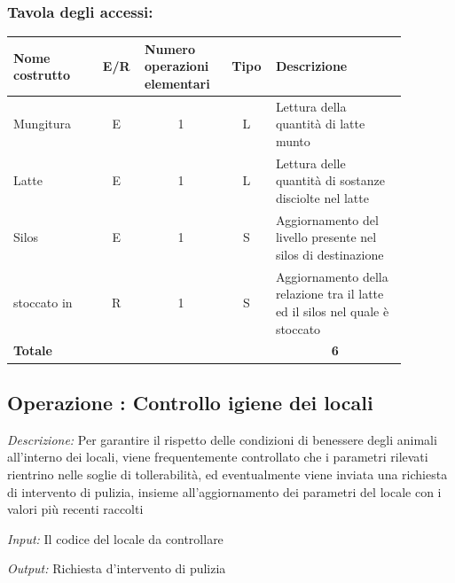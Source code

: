 \documentclass[12pt,a4paper]{article}
\begin{document}
\subsubsection*{Tavola degli accessi:}

\begin{center}\setlength{\extrarowheight}{1.5pt}\begin{longtable}{|p{0.2\linewidth}|p{0.1\linewidth}|p{0.175\linewidth}|p{0.1\linewidth}|p{0.3\linewidth}|}\hline \textbf{Nome costrutto}   & \multicolumn{1}{|c|}{\textbf{E/R}} & \textbf{Numero operazioni elementari} & \multicolumn{1}{|c|}{\textbf{Tipo}} & \textbf{Descrizione}\\ 
\hline
Mungitura
 & 
\multicolumn{1}{|c|}{E}
 & 
\multicolumn{1}{|c|}{1}
 & 
\multicolumn{1}{|c|}{L}
 & 
Lettura della quantità di latte munto
\\
\hline
Latte
 & 
\multicolumn{1}{|c|}{E}
 & 
\multicolumn{1}{|c|}{1}
 & 
\multicolumn{1}{|c|}{L}
 & 
Lettura delle quantità di sostanze disciolte nel latte
\\
\hline
Silos
 & 
\multicolumn{1}{|c|}{E}
 & 
\multicolumn{1}{|c|}{1}
 & 
\multicolumn{1}{|c|}{S}
 & 
Aggiornamento del livello presente nel silos di destinazione
\\
\hline
stoccato in
 & 
\multicolumn{1}{|c|}{R}
 & 
\multicolumn{1}{|c|}{1}
 & 
\multicolumn{1}{|c|}{S}
 & 
Aggiornamento della relazione tra il latte ed il silos nel quale è stoccato
\\
\hline
\multicolumn{4}{|l|}{\textbf{Totale}}
 & 
\multicolumn{1}{|c|}{\textbf{6}}
\\
\hline
\end{longtable}\end{center}
\pagebreak
\subsection*{Operazione \thecounterAccessi{}: Controllo igiene dei locali}
\noindent\textit{Descrizione:} Per garantire il rispetto delle condizioni di benessere degli animali all'interno dei locali, viene frequentemente controllato che i parametri rilevati rientrino nelle soglie di tollerabilità, ed eventualmente viene inviata una richiesta di intervento di pulizia, insieme all'aggiornamento dei parametri del locale con i valori più recenti raccolti

\noindent\textit{Input:} Il codice del locale da controllare

\noindent\textit{Output:} Richiesta d'intervento di pulizia
\end{document}
